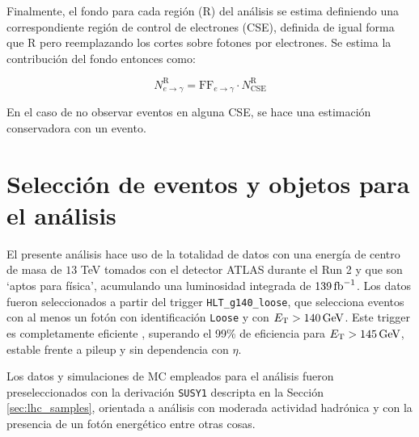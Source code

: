 Finalmente, el fondo para cada región (R) del análisis se estima definiendo una correspondiente región de control de electrones (CSE), definida de igual forma que R pero reemplazando los cortes sobre fotones por electrones. Se estima la contribución del fondo entonces como:


\begin{equation}
  N^{\text{R}}_{e\rightarrow\gamma} = \text{FF}_{e\to\gamma} \cdot N^{\text{R}}_{\mathrm{CSE}} 
  \label{eq:efake_cs}
\end{equation}

En el caso de no observar eventos en alguna CSE, se hace una estimación conservadora con un evento.



\section{Selección de eventos y objetos para el análisis}\label{sec:selection}

El presente análisis hace uso de la totalidad de datos con una energía de centro de masa de $13$ TeV tomados con el detector ATLAS durante el Run 2 y que son `aptos para física', acumulando una luminosidad integrada de $139\,\text{fb}^{-1}$. Los datos fueron seleccionados a partir del trigger \texttt{HLT\_g140\_loose}, que selecciona eventos con al menos un fotón con identificación \texttt{Loose} y con $E_{\text{T}}>140\,\text{GeV}$. Este trigger es completamente eficiente \cite{TRIG-2018-05}, superando el 99\% de eficiencia para $E_{\text{T}}>145\,\text{GeV}$, estable frente a pileup y sin dependencia con $\eta$.

Los datos y simulaciones de MC empleados para el análisis fueron preseleccionados con la derivación \texttt{SUSY1} descripta en la Sección \ref{sec:lhc_samples}, orientada a análisis con moderada actividad hadrónica y con la presencia de un fotón energético entre otras cosas.


